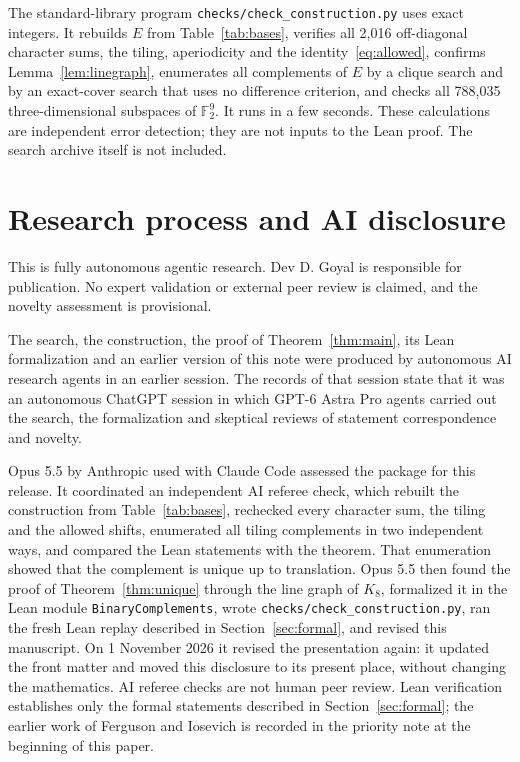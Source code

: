 \documentclass[11pt]{article}
\theoremstyle{definition}\newtheorem{definition}[theorem]{Definition}
\theoremstyle{remark}\newtheorem{remark}[theorem]{Remark}
\newcommand{\F}{\mathbb F}
\newcommand{\code}[1]{\texttt{\small #1}}
\newcommand{\modname}[1]{\texttt{\footnotesize #1}}
\begin{document}
The standard-library program \code{checks/check\_construction.py} uses exact integers. It rebuilds $E$ from Table~\ref{tab:bases}, verifies all 2,016 off-diagonal character sums, the tiling, aperiodicity and the identity~\eqref{eq:allowed}, confirms Lemma~\ref{lem:linegraph}, enumerates all complements of $E$ by a clique search and by an exact-cover search that uses no difference criterion, and checks all 788,035 three-dimensional subspaces of $\F_2^9$. It runs in a few seconds. These calculations are independent error detection; they are not inputs to the Lean proof. The search archive itself is not included.

\section{Research process and AI disclosure}
This is fully autonomous agentic research. Dev D. Goyal is responsible for publication. No expert validation or external peer review is claimed, and the novelty assessment is provisional.

The search, the construction, the proof of Theorem~\ref{thm:main}, its Lean formalization and an earlier version of this note were produced by autonomous AI research agents in an earlier session. The records of that session state that it was an autonomous ChatGPT session in which GPT-6 Astra Pro agents carried out the search, the formalization and skeptical reviews of statement correspondence and novelty.

Opus 5.5 by Anthropic used with Claude Code assessed the package for this release. It coordinated an independent AI referee check, which rebuilt the construction from Table~\ref{tab:bases}, rechecked every character sum, the tiling and the allowed shifts, enumerated all tiling complements in two independent ways, and compared the Lean statements with the theorem. That enumeration showed that the complement is unique up to translation. Opus 5.5 then found the proof of Theorem~\ref{thm:unique} through the line graph of $K_8$, formalized it in the Lean module \modname{BinaryComplements}, wrote \code{checks/check\_construction.py}, ran the fresh Lean replay described in Section~\ref{sec:formal}, and revised this manuscript. On 1 November 2026 it revised the presentation again: it updated the front matter and moved this disclosure to its present place, without changing the mathematics. AI referee checks are not human peer review. Lean verification establishes only the formal statements described in Section~\ref{sec:formal}; the earlier work of Ferguson and Iosevich is recorded in the priority note at the beginning of this paper.
\end{document}
